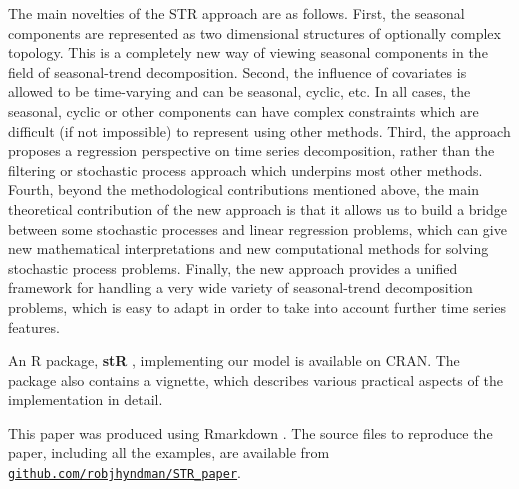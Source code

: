 \documentclass[ijds,nonblindrev]{informs-ijds}
\begin{document}
The main novelties of the STR approach are as follows. First, the seasonal components are represented as two dimensional structures of optionally complex topology. This is a completely new way of viewing seasonal components in the field of seasonal-trend decomposition. Second, the influence of covariates is allowed to be time-varying and can be seasonal, cyclic, etc. In all cases, the seasonal, cyclic or other components can have complex constraints which are difficult (if not impossible) to represent using other methods. Third, the approach proposes a regression perspective on time series decomposition, rather than the filtering or stochastic process approach which underpins most other methods. Fourth, beyond the methodological contributions mentioned above, the main theoretical contribution of the new approach is that it allows us to build a bridge between some stochastic processes and linear regression problems, which can give new mathematical interpretations and new computational methods for solving stochastic process problems. Finally, the new approach provides a unified framework for handling a very wide variety of seasonal-trend decomposition problems, which is easy to adapt in order to take into account further time series features.

An R package, \textbf{stR} \citep{stR}, implementing our model is available on CRAN.
The package also contains a vignette, which describes various practical aspects of the implementation in detail.

This paper was produced using Rmarkdown \citep{rmarkdown}. The source files to reproduce the paper, including all the examples, are available from \href{https://github.com/robjhyndman/STR_paper}{\texttt{github.com/robjhyndman/STR\_paper}}.







\end{document}
